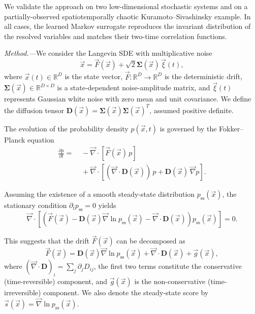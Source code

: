 \documentclass[%
  prl,
  reprint,
  amsmath,
  amssymb,
  aps
]{revtex4-2}
\newcommand{\vvec}[1]{\vec{#1}}
\begin{document}
We validate the approach on two low-dimensional stochastic systems and on a partially-observed spatiotemporally chaotic Kuramoto--Sivashinsky example. In all cases, the learned Markov surrogate reproduces the invariant distribution of the resolved variables and matches their two-time correlation functions.


\textit{Method.---}We consider the Langevin SDE with multiplicative noise
\begin{equation}
    \dot{\vvec x}=\vvec F(\vvec x)+\sqrt{2} \bm\Sigma(\vvec x)\,\vvec\xi(t),
    \label{eq:sde_intro}
\end{equation}
where $\vvec{x}(t) \in \mathbb{R}^D$ is the state vector, $\vvec{F}: \mathbb{R}^D \to \mathbb{R}^D$ is the deterministic drift, $\bm{\Sigma}(\vvec x) \in \mathbb{R}^{D\times D}$ is a state-dependent noise-amplitude matrix, and $\vvec{\xi}(t)$ represents Gaussian white noise with zero mean and unit covariance. We define the diffusion tensor $\bm{D}(\vvec{x}) = \bm{\Sigma}(\vvec{x})\bm{\Sigma}(\vvec{x})^T$, assumed positive definite.

The evolution of the probability density $p(\vvec{x},t)$ is governed by the Fokker--Planck equation
\begin{equation}
\label{eq:fokker_planck}
\begin{aligned}
\frac{\partial p}{\partial t}
=&\; -\vvec{\nabla} \cdot \left[\vvec{F}(\vvec{x})\,p\right] \\
&\; + \vvec{\nabla} \cdot \left[(\vvec{\nabla}\cdot\bm{D}(\vvec{x}))\,p + \bm{D}(\vvec{x})\,\vvec{\nabla} p\right].
\end{aligned}
\end{equation}

Assuming the existence of a smooth steady-state distribution $p_{\mathrm{ss}}(\vvec{x})$, the stationary condition $\partial_t p_{\mathrm{ss}} = 0$ yields
\begin{equation}
\vvec{\nabla} \cdot \left[\left(\vvec{F}(\vvec{x}) - \bm{D}(\vvec{x})\vvec{\nabla} \ln p_{\mathrm{ss}}(\vvec{x}) - \vvec{\nabla}\cdot\bm{D}(\vvec{x})\right)p_{\mathrm{ss}}(\vvec{x})\right] = 0.
\end{equation}

This suggests that the drift $\vvec{F}(\vvec{x})$ can be decomposed as
\begin{equation}
\vvec{F}(\vvec{x}) = \bm{D}(\vvec{x})\vvec{\nabla} \ln p_{\mathrm{ss}}(\vvec{x}) + \vvec{\nabla}\cdot\bm{D}(\vvec{x}) + \vvec{g}(\vvec{x}),
\end{equation}
where $(\vvec{\nabla}\cdot\bm{D})_i = \sum_j \partial_j D_{ij}$, the first two terms constitute the conservative (time-reversible) component, and $\vvec{g}(\vvec{x})$ is the non-conservative (time-irreversible) component. We also denote the steady-state score by $\vvec{s}(\vvec{x})=\vvec{\nabla}\ln p_{\mathrm{ss}}(\vvec{x})$.
\end{document}
